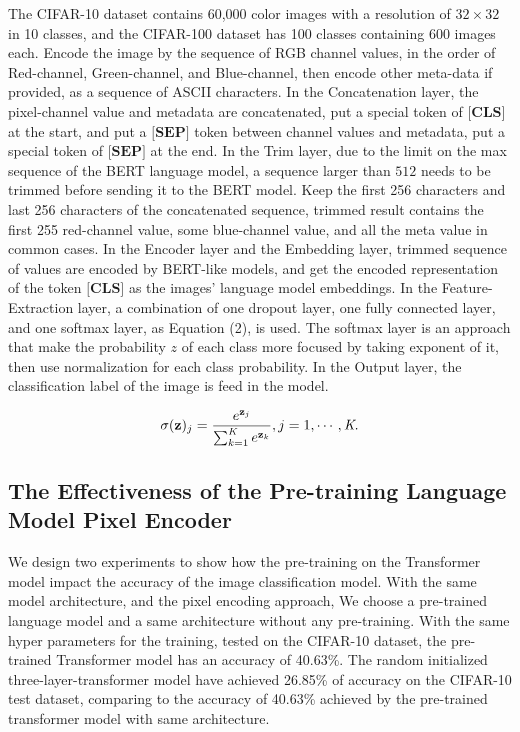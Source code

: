 \documentclass[10pt,twocolumn,letterpaper]{article}
\begin{document}
\par The CIFAR-10 dataset contains 60,000 color images with a resolution of $32\times32$ in 10 classes, and the CIFAR-100 dataset has 100 classes containing 600 images each.
Encode the image by the sequence of RGB channel values, in the order of Red-channel, Green-channel, and Blue-channel,
then encode other meta-data if provided, as a sequence of ASCII characters.
In the Concatenation layer, the pixel-channel value and metadata are concatenated, put a special token of $\textbf{[CLS]}$ at the start,
and put a $\textbf{[SEP]}$ token between channel values and metadata, put a special token of $\textbf{[SEP]}$ at the end.
In the Trim layer, due to the limit on the max sequence of the BERT language model, a sequence larger than $512$ needs to be trimmed before sending it to the BERT model.
Keep the first 256 characters and last 256 characters of the concatenated sequence, trimmed result contains the first 255 red-channel value,
some blue-channel value, and all the meta value in common cases.
In the Encoder layer and the Embedding layer, trimmed sequence of values are encoded by BERT-like models,
and get the encoded representation of the token $\textbf{[CLS]}$ as the images' language model embeddings.
In the Feature-Extraction layer, a combination of one dropout layer, one fully connected layer, and one softmax layer, as Equation (2), is used.
The softmax layer is an approach that make the probability $z$ of each class more focused by taking exponent of it, then use normalization for each class probability.
In the Output layer, the classification label of the image is feed in the model.

\begin{equation}
  \sigma(\textbf{z})_j = {e^{\textbf{z}_j} \over {\sum_{k=1}^{\textit{K}} e^{\textbf{z}_k}}}, j=1,\cdots,\textit{K}.
\end{equation}


\subsection{The Effectiveness of the Pre-training Language Model Pixel Encoder}

\par We design two experiments to show how the pre-training on the Transformer model impact the accuracy of the image classification model.
With the same model architecture, and the pixel encoding approach, We choose a pre-trained language model and a same architecture without any pre-training.
With the same hyper parameters for the training, tested on the CIFAR-10 dataset, the pre-trained Transformer model has an accuracy of 40.63\%.
The random initialized three-layer-transformer model have achieved 26.85\% of accuracy on the CIFAR-10 test dataset, comparing to the accuracy of 40.63\% achieved by the
pre-trained transformer model with same architecture.
\end{document}
